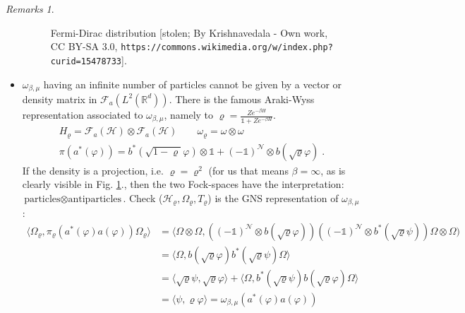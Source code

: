 \documentclass[
a4paper, %
11pt, %
onecolumn, %
openany, %
]{memoir}
\theoremstyle{definition}
\theoremstyle{remark}
\newtheorem{remarks}{Remarks}[chapter]
\theoremstyle{plain}
\begin{document}
\begin{remarks}
\begin{itemize}
\begin{figure}
		 	\caption{Fermi-Dirac distribution [stolen; By Krishnavedala - Own work, CC BY-SA 3.0, \texttt{https://commons.wikimedia.org/w/index.php?curid=15478733}]\label{fermidirac}.}
		 \end{figure}
	 \item $\omega_{\beta,\mu}$ having an infinite number of particles cannot be given by a vector or density matrix in $\mathcal{F}_a(L^2(\mathbb{R}^d))$. There is the famous Araki-Wyss representation associated to $\omega_{\beta,\mu}$, namely to $\varrho=\frac{Ze^{-\beta H}}{\mathds{1}+Ze^{-\beta H}}$. \begin{align}
	 H_{\varrho}=\mathcal{F}_a (\mathcal{H}) \otimes \mathcal{F}_a(\mathcal{H}) \qquad \omega_{\varrho}=\omega\otimes\omega \\
	 \pi(a^*(\varphi))=b^*(\sqrt{1-\varrho}\varphi)\otimes \mathds{1}+(-\mathds{1})^{\mathcal{N}}\otimes b(\sqrt{\varrho}\varphi)\; .
	 \end{align}
	 If the density is a projection, i.e. $\varrho=\varrho^2$ (for us that means $\beta=\infty$, as is clearly visible in Fig. \ref{fermidirac}., then the two Fock-spaces have the interpretation: $\text{particles}\otimes\text{antiparticles}$. Check ($\mathcal{H}_\varrho,\Omega_{\varrho},T_{\varrho}$) is the GNS representation of $\omega_{\beta,\mu}$: \begin{align}
	 \langle \Omega_{\varrho},\pi_{\varrho}(a^*(\varphi)a(\varphi))\Omega_{\varrho}\rangle&=\langle \Omega\otimes \Omega,\left((-\mathds{1})^{\mathcal{N}}\otimes b(\sqrt{\varrho}\varphi)\right)\left((-\mathds{1})^{\mathcal{N}}\otimes b^*(\sqrt{\varrho}\psi)\right)\Omega\otimes \Omega)\\
	 &=\langle \Omega,b(\sqrt{\varrho}\varphi)b^*(\sqrt{\varrho}\psi)\Omega\rangle\\
	 &=\langle \sqrt{\varrho}\psi,\sqrt{\varrho}\varphi\rangle+\langle \Omega ,b^*(\sqrt{\varrho}\psi)b(\sqrt{\varrho}\varphi)\Omega\rangle\\
	 &=\langle \psi,\varrho\varphi\rangle=\omega_{\beta,\mu}(a^*(\varphi)a(\varphi))
	 \end{align}
	\end{itemize}
\end{remarks}
\end{document}

